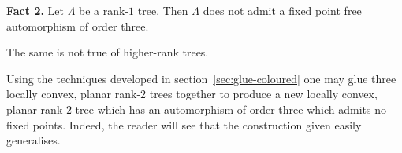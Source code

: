 \documentclass[12pt]{amsart}
\theoremstyle{definition}
\theoremstyle{remark}
\numberwithin{equation}{section}
\begin{document}
\noindent
\textbf{Fact 2.} Let $\Lambda$ be a rank-$1$ tree. Then $\Lambda$ does not admit a fixed point free automorphism of order three.


\vspace{3mm}

\noindent
The same is not true of higher-rank trees.
\vspace{3mm}

\noindent
Using the techniques developed in section~\ref{sec:glue-coloured} one may glue three locally convex, planar rank-$2$ trees together to produce a new locally convex, planar rank-$2$ tree  which has an automorphism of order three which admits no fixed points. Indeed, the reader will see that the construction given easily generalises.
\end{document}
